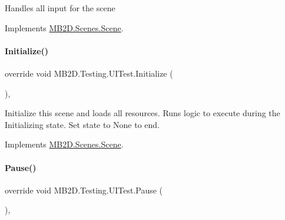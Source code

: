 Handles all input for the scene 



Implements \hyperlink{class_m_b2_d_1_1_scenes_1_1_scene_a476de5a885408d27ff151044d20738c8}{M\+B2\+D.\+Scenes.\+Scene}.

\hypertarget{class_m_b2_d_1_1_testing_1_1_u_i_test_af6f33faaa93d646edd5c74dfee6139d1}{}\label{class_m_b2_d_1_1_testing_1_1_u_i_test_af6f33faaa93d646edd5c74dfee6139d1} 
\paragraph{\texorpdfstring{Initialize()}{Initialize()}}
{\footnotesize\ttfamily override void M\+B2\+D.\+Testing.\+U\+I\+Test.\+Initialize (\begin{DoxyParamCaption}{ }\end{DoxyParamCaption})\hspace{0.3cm}{\ttfamily [inline]}, {\ttfamily [virtual]}}



Initialize this scene and loads all resources. Runs logic to execute during the Initializing state. Set state to None to end. 



Implements \hyperlink{class_m_b2_d_1_1_scenes_1_1_scene_a081b4f8866936b495bdce388a7c96c25}{M\+B2\+D.\+Scenes.\+Scene}.

\hypertarget{class_m_b2_d_1_1_testing_1_1_u_i_test_ae829ddfd489047674efb3131d360901a}{}\label{class_m_b2_d_1_1_testing_1_1_u_i_test_ae829ddfd489047674efb3131d360901a} 
\paragraph{\texorpdfstring{Pause()}{Pause()}}
{\footnotesize\ttfamily override void M\+B2\+D.\+Testing.\+U\+I\+Test.\+Pause (\begin{DoxyParamCaption}{ }\end{DoxyParamCaption})\hspace{0.3cm}{\ttfamily [inline]}, {\ttfamily [virtual]}}



